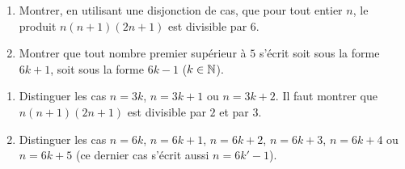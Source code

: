 \documentclass[11pt,class=report,crop=false]{standalone}
\begin{document}
\exercice{}
\sauteligne
\begin{enumerate}
    \item Montrer, en utilisant une disjonction de cas, que pour tout entier $n$, le produit $n(n+1)(2n+1)$ est divisible par $6$.
    
    \item Montrer que tout nombre premier supérieur à $5$ s'écrit soit sous la forme $6k+1$, soit sous la forme $6k-1$ ($k \in \mathbb{N}$).
\end{enumerate}
\finenonce

\indication
\sauteligne
\begin{enumerate}
    \item Distinguer les cas $n=3k$, $n=3k+1$ ou $n=3k+2$. Il faut montrer que $n(n+1)(2n+1)$ est divisible par $2$ et par $3$.
    
    \item Distinguer les cas $n=6k$, $n=6k+1$, $n=6k+2$, $n=6k+3$, $n=6k+4$ ou $n=6k+5$ (ce dernier cas s'écrit aussi $n=6k'-1$). 
\end{enumerate}
\finindication
\end{document}
